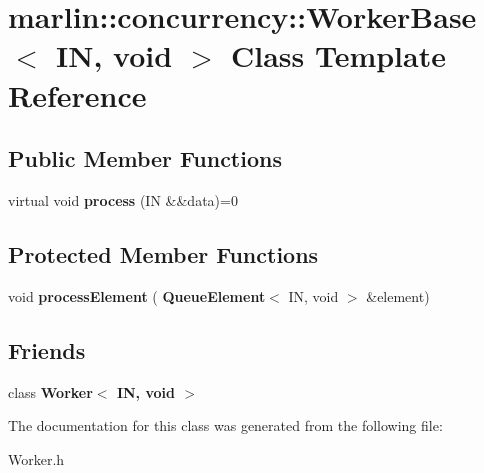 \section{marlin\+:\+:concurrency\+:\+:Worker\+Base$<$ IN, void $>$ Class Template Reference}
\label{classmarlin_1_1concurrency_1_1WorkerBase_3_01IN_00_01void_01_4}
\subsection*{Public Member Functions}
\begin{DoxyCompactItemize}
\item 
\mbox{\label{classmarlin_1_1concurrency_1_1WorkerBase_3_01IN_00_01void_01_4_ad35e6d3233031ccdfda2106539c87070}} 
virtual void {\bfseries process} (IN \&\&data)=0
\end{DoxyCompactItemize}
\subsection*{Protected Member Functions}
\begin{DoxyCompactItemize}
\item 
\mbox{\label{classmarlin_1_1concurrency_1_1WorkerBase_3_01IN_00_01void_01_4_a72188e60c2606807fcf9d8c03fa52182}} 
void {\bfseries process\+Element} (\textbf{ Queue\+Element}$<$ IN, void $>$ \&element)
\end{DoxyCompactItemize}
\subsection*{Friends}
\begin{DoxyCompactItemize}
\item 
\mbox{\label{classmarlin_1_1concurrency_1_1WorkerBase_3_01IN_00_01void_01_4_add3f4af0b28490976419290c6ee4691a}} 
class {\bfseries Worker$<$ I\+N, void $>$}
\end{DoxyCompactItemize}


The documentation for this class was generated from the following file\+:\begin{DoxyCompactItemize}
\item 
Worker.\+h\end{DoxyCompactItemize}
